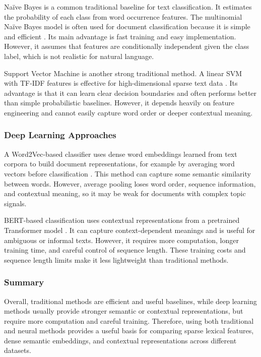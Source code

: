 Naïve Bayes is a common traditional baseline for text classification. It estimates the probability of each class from word occurrence features. The multinomial Naïve Bayes model is often used for document classification because it is simple and efficient \cite{mccallum1998comparison}. Its main advantage is fast training and easy implementation. However, it assumes that features are conditionally independent given the class label, which is not realistic for natural language.

Support Vector Machine is another strong traditional method. A linear SVM with TF-IDF features is effective for high-dimensional sparse text data \cite{joachims1998text}. Its advantage is that it can learn clear decision boundaries and often performs better than simple probabilistic baselines. However, it depends heavily on feature engineering and cannot easily capture word order or deeper contextual meaning.

\subsubsection{Deep Learning Approaches}

A Word2Vec-based classifier uses dense word embeddings learned from text corpora to build document representations, for example by averaging word vectors before classification \cite{mikolov2013efficient}. This method can capture some semantic similarity between words. However, average pooling loses word order, sequence information, and contextual meaning, so it may be weak for documents with complex topic signals.

BERT-based classification uses contextual representations from a pretrained Transformer model \cite{devlin2019bert}. It can capture context-dependent meanings and is useful for ambiguous or informal texts. However, it requires more computation, longer training time, and careful control of sequence length. These training costs and sequence length limits make it less lightweight than traditional methods.

\subsubsection{Summary}

Overall, traditional methods are efficient and useful baselines, while deep learning methods usually provide stronger semantic or contextual representations, but require more computation and careful training. Therefore, using both traditional and neural methods provides a useful basis for comparing sparse lexical features, dense semantic embeddings, and contextual representations across different datasets.
